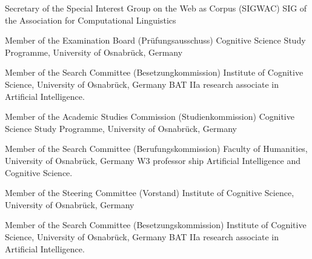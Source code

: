
        {Secretary of the Special Interest Group on the Web as Corpus (SIGWAC)}
        {}
        {SIG of the Association for Computational Linguistics}
        {}
        {}

        {Member of the Examination Board (Pr\"{u}fungsausschuss)}
        {}
        {Cognitive Science Study Programme, University of Osnabr\"{u}ck, Germany}
        {}
        {}

        {Member of the Search Committee (Besetzungkommission)}
        {}
        {Institute of Cognitive Science, University of Osnabr\"{u}ck, Germany}
        {}
        {BAT IIa research associate in Artificial Intelligence.}

        {Member of the Academic Studies Commission (Studienkommission)}
        {}
        {Cognitive Science Study Programme, University of Osnabr\"{u}ck, Germany}
        {}
        {}

        {Member of the Search Committee (Berufungskommission)}
        {}
        {Faculty of Humanities, University of Osnabr\"{u}ck, Germany}
        {}
        {W3 professor ship Artificial Intelligence and Cognitive Science.}

        {Member of the Steering Committee (Vorstand)}
        {}
        {Institute of Cognitive Science, University of Osnabr\"{u}ck, Germany}
        {}
        {}

        {Member of the Search Committee (Besetzungskommission)}
        {}
        {Institute of Cognitive Science, University of Osnabr\"{u}ck, Germany}
        {}
        {BAT IIa research associate in Artificial Intelligence.}

